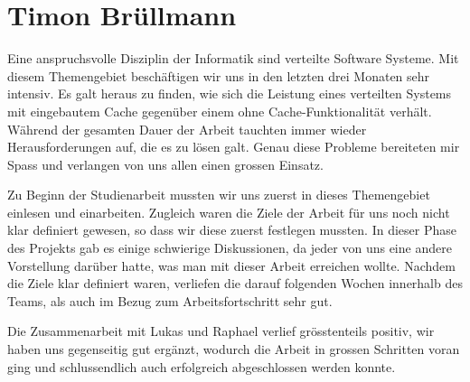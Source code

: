 \section{Timon Brüllmann}

Eine anspruchsvolle Disziplin der Informatik sind verteilte Software Systeme. Mit diesem Themengebiet beschäftigen wir uns in den letzten drei Monaten sehr intensiv. Es galt heraus zu finden, wie sich die Leistung eines verteilten Systems mit eingebautem Cache gegenüber einem ohne Cache-Funktionalität verhält. Während der gesamten Dauer der Arbeit tauchten immer wieder Herausforderungen auf, die es zu lösen galt. Genau diese Probleme bereiteten mir Spass und verlangen von uns allen einen grossen Einsatz.


Zu Beginn der Studienarbeit mussten wir uns zuerst in dieses Themengebiet einlesen und einarbeiten. Zugleich waren die Ziele der Arbeit für uns noch nicht klar definiert gewesen, so dass wir diese zuerst festlegen mussten. In dieser Phase des Projekts gab es einige schwierige Diskussionen, da jeder von uns eine andere Vorstellung darüber hatte, was man mit dieser Arbeit erreichen wollte. Nachdem die Ziele klar definiert waren, verliefen die darauf folgenden Wochen innerhalb des Teams, als auch im Bezug zum Arbeitsfortschritt sehr gut.  


Die Zusammenarbeit mit Lukas und Raphael verlief grösstenteils positiv, wir haben uns gegenseitig gut ergänzt, wodurch die Arbeit in grossen Schritten voran ging und schlussendlich auch erfolgreich abgeschlossen werden konnte.

